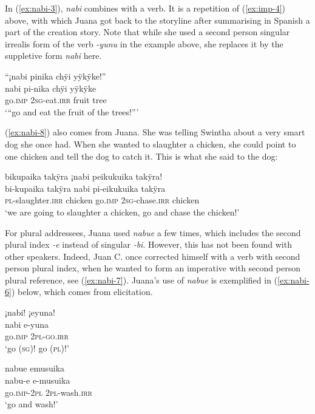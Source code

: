 In (\ref{ex:nabi-3}), \textit{nabi} combines with a verb. It is a repetition of (\ref{ex:imp-4}) above, with which Juana got back to the storyline after summarising in Spanish a part of the creation story. Note that while she used a second person singular irrealis form of the verb \textit{-yunu} in the example above, she replaces it by the suppletive form \textit{nabi} here.

\ea\label{ex:nabi-3}
\begingl
\glpreamble “¡nabi pinika chÿi yÿkÿke!”\\
\gla nabi pi-nika chÿi yÿkÿke\\
\glb go.\textsc{imp} 2\textsc{sg}-eat.\textsc{irr} fruit tree\\
\glft ‘“go and eat the fruit of the trees!”’
\endgl
\trailingcitation{[jxx-n101013s-1.885]}
\xe

(\ref{ex:nabi-8}) also comes from Juana. She was telling Swintha about a very smart dog she once had. When she wanted to slaughter a chicken, she could point to one chicken and tell the dog to catch it. This is what she said to the dog:

\ea\label{ex:nabi-8}
\begingl
\glpreamble bikupaika takÿra ¡nabi peikukuika takÿra!\\
\gla bi-kupaika takÿra nabi pi-eikukuika takÿra\\
\textsc{pl}-slaughter.\textsc{irr} chicken go.\textsc{imp} 2\textsc{sg}-chase.\textsc{irr} chicken\\
\glft ‘we are going to slaughter a chicken, go and chase the chicken!’
\endgl
\trailingcitation{[jxx-e191021e-2]}
\xe


For plural addressees, Juana used \textit{nabue} a few times, which includes the second plural index \textit{-e} instead of singular \textit{-bi}. However, this has not been found with other speakers. Indeed, Juan C. once corrected himself with a verb with second person plural index, when he wanted to form an imperative with second person plural reference, see (\ref{ex:nabi-7}). Juana’s use of \textit{nabue} is exemplified in (\ref{ex:nabi-6}) below, which comes from elicitation.

\ea\label{ex:nabi-7}
\begingl
\glpreamble ¡nabi! ¡eyuna!\\
\gla nabi e-yuna\\
\glb go.\textsc{imp} 2\textsc{pl-go.\textsc{irr}}\\
\glft ‘go (\textsc{sg})! go (\textsc{pl})!’
\endgl
\trailingcitation{[mqx-p110826l.031]}
\xe

\ea\label{ex:nabi-6}
\begingl
\glpreamble nabue emusuika\\
\gla nabu-e e-musuika\\
\glb go.\textsc{imp}-2\textsc{pl} 2\textsc{pl}-wash.\textsc{irr}\\
\glft ‘go and wash!’
\endgl
\trailingcitation{[jxx-e081025s-1.535]}
\xe

